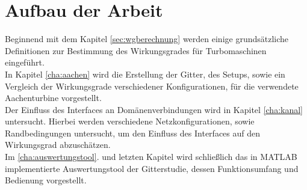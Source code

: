 \section*{Aufbau der Arbeit}
Beginnend mit dem Kapitel \ref{sec:wgberechnung} werden einige grundsätzliche Definitionen zur Bestimmung des Wirkungsgrades für Turbomaschinen eingeführt.\\
In Kapitel \ref{cha:aachen} wird die Erstellung der Gitter, des Setups, sowie ein Vergleich der Wirkungsgrade verschiedener Konfigurationen, für die verwendete Aachenturbine vorgestellt.\\
Der Einfluss des Interfaces an Domänenverbindungen wird in Kapitel \ref{cha:kanal} untersucht. Hierbei werden verschiedene Netzkonfigurationen, sowie Randbedingungen untersucht, um den Einfluss des Interfaces auf den Wirkungsgrad abzuschätzen.\\
Im \ref{cha:auswertungstool}. und letzten Kapitel wird schließlich das in MATLAB implementierte Auswertungstool der Gitterstudie, dessen Funktionsumfang und Bedienung vorgestellt. 